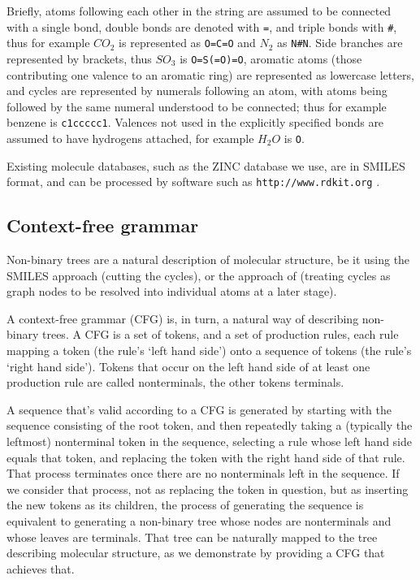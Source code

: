 \documentclass[11pt]{article}
\begin{document}
Briefly, atoms following each other in the string are assumed to be connected with a single bond, double bonds are denoted with \verb|=|, and triple bonds with \verb|#|, thus for example $CO_2$ is represented as \verb|O=C=O| and $N_2$ as \verb|N#N|. Side branches are represented by brackets, thus $SO_3$ is \verb|O=S(=O)=O|, aromatic atoms (those contributing one valence to an aromatic ring) are represented as lowercase letters, and cycles are represented by numerals following an atom, with atoms being followed by the same numeral understood to be connected; thus for example benzene is \verb|c1ccccc1|. Valences not used in the explicitly specified bonds are assumed to have hydrogens attached, for example $H_2O$ is \verb|O|.

Existing molecule databases, such as the ZINC database \cite{zinc15} we use, are in SMILES format, and can be processed by software such as \verb|http://www.rdkit.org| \cite{rdkit}.
\subsection{Context-free grammar}
Non-binary trees are a natural description of molecular structure, be it using the SMILES approach (cutting the cycles), or the approach of \cite{jin18} (treating cycles as graph nodes to be resolved into individual atoms at a later stage).

A context-free grammar (CFG) is, in turn, a natural way of describing non-binary trees. A CFG is a set of tokens, and a set of production rules, each rule mapping a token (the rule's `left hand side') onto a sequence of tokens (the rule's `right hand side'). Tokens that occur on the left hand side of at least one production rule are called nonterminals, the other tokens terminals.

A sequence that's valid according to a CFG is generated by starting with the sequence consisting of the root token, and then repeatedly taking a (typically the leftmost) nonterminal token in the sequence, selecting a rule whose left hand side equals that token, and replacing the token with the right hand side of that rule. That process terminates once there are no nonterminals left in the sequence. If we consider that process, not as replacing the token in question, but as inserting the new tokens as its children, the process of generating the sequence is equivalent to generating a non-binary tree whose nodes are nonterminals and whose leaves are terminals. That tree can be naturally mapped to the tree describing molecular structure, as we demonstrate by providing a CFG that achieves that.
\end{document}
